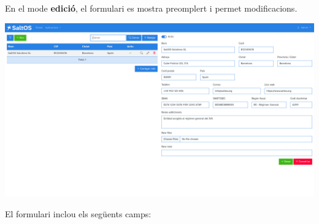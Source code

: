 \documentclass[a4paper]{article}
\begin{document}
En el mode \textbf{edició}, el formulari es mostra preomplert i permet modificacions.

\begin{center}\includegraphics[width=1\textwidth]{../ujest/snaps/test-screenshots-js-screenshots-company-company-edit-1-ca-es-1-snap.png}\end{center}

El formulari inclou els següents camps:
\end{document}
